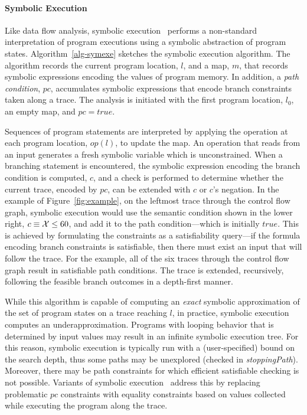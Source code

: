 \paragraph{Symbolic Execution}
Like data flow analysis, symbolic execution~\cite{king1976symbolic,clarke1976system} 
performs a non-standard interpretation of program executions using 
a symbolic abstraction of program states.
Algorithm~\ref{alg-symexe} sketches the symbolic execution algorithm.
The algorithm records the current program location, $l$,
and a map, $m$, that records symbolic expressions encoding the
values of program memory.  In addition, a \textit{path condition}, $pc$,
accumulates symbolic expressions that encode branch constraints 
taken along a trace.  The analysis is initiated with the first
program location, $l_0$, an empty map, and $pc = true$.

Sequences of program statements are interpreted by applying the operation
at each program location, $op(l)$, to update the map.  
An operation that reads from an input generates a fresh symbolic
variable which is unconstrained.  
When a branching statement is encountered, the symbolic expression encoding
the branch condition is computed, $c$, and a check is performed
to determine whether the current trace, encoded by $pc$, can be
extended with $c$ or $c$'s negation.  
In the example of Figure~\ref{fig:example}, on the leftmost trace through
the control flow graph, symbolic execution would use the semantic
condition shown in the lower right, $c \equiv {\cal X} \le 60$,
and add it to the path condition---which is initially $true$.
This is achieved by formulating the constraints
as a satisfiability query---if the formula encoding branch constraints
is satisfiable, then there must exist an input that will follow the trace.
For the example, all of the six traces through the control flow graph 
result in satisfiable path conditions.
The trace is extended, recursively, following the feasible branch outcomes
in a depth-first manner.

While this algorithm is capable of computing an \textit{exact} symbolic
approximation of the set of program states on a trace reaching $l$, in
practice, symbolic execution computes an underapproximation.
Programs with looping behavior that is determined by input values 
may result in an infinite symbolic execution tree. 
For this reason, symbolic execution is
typically run with a (user-specified) bound on the search depth, thus
some paths may be unexplored (checked in {\it stoppingPath}).   Moreover, there may be path constraints
for which efficient satisfiable checking is not possible.  Variants of
symbolic execution~\cite{godefroid2005dart,sen2005cute,song2008bitblaze} 
address this by replacing problematic $pc$ constraints with equality
constraints based on values collected while executing the program along the trace.

